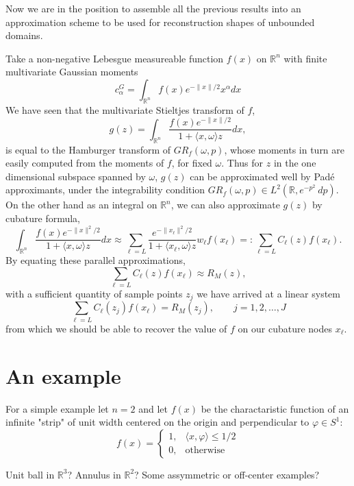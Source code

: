 \documentclass{amsart}
\theoremstyle{remark}
\numberwithin{equation}{section}
\newcommand{\RR}{\mathbb{R}}
\begin{document}



Now we are in the position to assemble all the previous results into an approximation scheme to be used for reconstruction shapes of unbounded domains.

Take a non-negative Lebesgue measureable function $f(x)$ on $\RR^n$ with finite multivariate Gaussian moments
\[
    c^G_\alpha = \int_{\RR^n} f(x)e^{-\|x\|/2} x^\alpha dx
\]
We have seen that the multivariate Stieltjes transform of $f$, 
\[
    g(z) = \int_{\RR^n} \frac{f(x)e^{-\|x\|/2}}{1 + \langle x, \omega \rangle z} dx,
\]
is equal to the Hamburger transform of $GR_f(\omega, p)$, whose moments in turn are easily computed from the moments of $f$, for fixed $\omega$. Thus for $z$ in the one dimensional subspace spanned by $\omega$, $g(z)$ can be approximated well by Pad\'e approximants, under the integrability condition $GR_f(\omega, p) \in L^2(\RR, e^{-p^2}~dp)$. On the other hand as an integral on $\RR^n$, we can also approximate $g(z)$ by cubature formula,
\[
    \int_{\RR^n} \frac{f(x)e^{-\|x\|^2/2}}{1 + \langle x, \omega \rangle z} dx 
    \approx \sum_{\ell = L} \frac{e^{-\|x_\ell\|^2/2}}{1 + \langle x_\ell, \omega \rangle z} w_\ell f(x_\ell)
    =: \sum_{\ell = L} C_\ell(z) f(x_\ell).
\]
By equating these parallel approximations, 
\[
    \sum_{\ell = L} C_\ell(z) f(x_\ell) \approx R_M(z),
\]
with a sufficient quantity of sample points $z_j$ we have arrived at a linear system
\[
    \sum_{\ell = L} C_\ell(z_j) f(x_\ell) = R_M(z_j), 
    \qquad j = 1, 2, \ldots, J
\]
from which we should be able to recover the value of $f$ on our cubature nodes $x_\ell$.





\section{An example}

For a simple example let $n = 2$ and let $f(x)$ be the charactaristic function of an infinite "strip" of unit width centered on the origin and perpendicular to $\varphi \in S^1$:
\[
    f(x) =
    \begin{cases}
        1, & \langle x, \varphi \rangle \leq 1/2 \\
        0, & \text{otherwise}
    \end{cases}
\]

Unit ball in $\RR^3$? Annulus in $\RR^2$? Some assymmetric or off-center examples?




\end{document}
